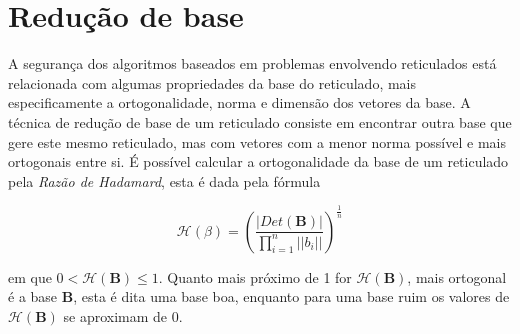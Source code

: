 \section{Redução de base}
\label{cap:reducao_base}
    A segurança dos algoritmos baseados em problemas envolvendo reticulados está relacionada com algumas propriedades da base do reticulado, mais especificamente a ortogonalidade, norma e dimensão dos vetores da base. A técnica de redução de base de um reticulado consiste em encontrar outra base que gere este mesmo reticulado, mas com vetores com a menor norma possível e mais ortogonais entre si. É possível calcular a ortogonalidade da base de um reticulado pela \textit{Razão de Hadamard}, esta é dada pela fórmula
    
    $$ \mathcal{H}(\beta) = \left( \frac{|Det(\textbf{B})|}{ \prod_{i=1}^{n} ||b_i||  } \right)^\frac{1}{n} $$

    \noindent
    em que $0 < \mathcal{H}(\textbf{B}) \leq 1$\cite{barros}. Quanto mais próximo de 1 for $\mathcal{H}(\textbf{B})$, mais ortogonal é a base $\textbf{B}$, esta é dita uma base boa, enquanto para uma base ruim os valores de $\mathcal{H}(\textbf{B})$ se aproximam de 0.
    
